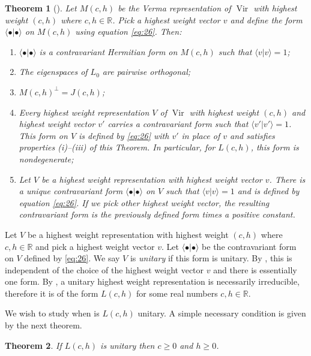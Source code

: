 \documentclass[a4paper, 12pt, reqno]{amsart}
\newtheorem{theorem}{Theorem}[section]
\theoremstyle{remark}
\numberwithin{equation}{subsection}
\DeclareMathOperator{\Vir}{Vir}
\begin{document}
\begin{theorem}[{\cite[Proposition 3.4]{kac_bombay_2013}}]
  \label{thr:29}
  Let $M(c, h)$ be the Verma representation of $\Vir$ with highest weight $(c, h)$ where $c, h \in \mathbb{R}$.
  Pick a highest weight vector $v$ and define the form $\langle \bullet| \bullet\rangle$ on $M(c, h)$ using equation \eqref{eq:26}.
  Then:
  \begin{enumerate}
  \item $\langle \bullet| \bullet\rangle$ is a contravariant Hermitian form on $M(c, h)$ such that $\langle v| v\rangle = 1$;
  \item The eigenspaces of $L_0$ are pairwise orthogonal;
  \item $M(c, h)^{\perp} = J(c, h)$;
  \item Every highest weight representation $V$ of $\Vir$ with highest weight $(c, h)$ and highest weight vector $v'$ carries a contravariant form such that $\langle v'| v'\rangle = 1$.
    This form on $V$ is defined by \eqref{eq:26} with $v'$ in place of $v$ and satisfies properties \emph{(i)--(iii)} of this Theorem.
    In particular, for $L(c, h)$, this form is nondegenerate;
  \item Let $V$ be a highest weight representation with highest weight vector $v$.
    There is a unique contravariant form $\langle \bullet| \bullet\rangle$ on $V$ such that $\langle v| v\rangle = 1$ and is defined by equation \eqref{eq:26}.
    If we pick other highest weight vector, the resulting contravariant form is the previously defined form times a positive constant.
  \end{enumerate}
\end{theorem}

Let $V$ be a highest weight representation with highest weight $(c, h)$ where $c, h \in \mathbb{R}$ and pick a highest weight vector $v$.
Let $\langle \bullet| \bullet\rangle$ be the contravariant form on $V$ defined by \eqref{eq:26}.
We say $V$ is \emph{unitary} if this form is unitary.
By , this is independent of the choice of the highest weight vector $v$ and there is essentially one form.
By , a unitary highest weight representation is necessarily irreducible, therefore it is of the form $L(c, h)$ for some real numbers $c, h \in \mathbb{R}$.

We wish to study when is $L(c, h)$ unitary.
A simple necessary condition is given by the next theorem.

\begin{theorem}
  \label{thr:30}
  If $L(c, h)$ is unitary then $c \ge 0$ and $h \ge 0$.
\end{theorem}
\end{document}
